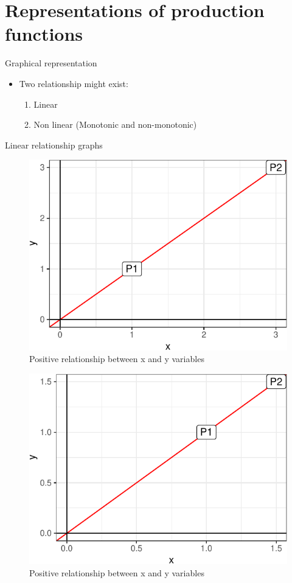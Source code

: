 \documentclass[12pt,ignorenonframetext,aspectratio=169]{beamer}
\providecommand{\tightlist}{%
  \setlength{\itemsep}{0pt}\setlength{\parskip}{0pt}}
\begin{document}
\hypertarget{representations-of-production-functions}{%
\section{Representations of production
functions}\label{representations-of-production-functions}}

\begin{frame}{Graphical representation}
\protect\hypertarget{graphical-representation}{}
\begin{itemize}
\tightlist
\item
  Two relationship might exist:

  \begin{enumerate}
  \tightlist
  \item
    Linear
  \item
    Non linear (Monotonic and non-monotonic)
  \end{enumerate}
\end{itemize}
\end{frame}

\begin{frame}{Linear relationship graphs}
\protect\hypertarget{linear-relationship-graphs}{}
\begin{figure}
\includegraphics[width=0.28\linewidth]{02-production_economics_files/figure-beamer/linear-relationship-positive-1} \caption{Positive relationship between x and y variables}\label{fig:linear-relationship-positive-1}
\end{figure}
\begin{figure}
\includegraphics[width=0.28\linewidth]{02-production_economics_files/figure-beamer/linear-relationship-positive-2} \caption{Positive relationship between x and y variables}\label{fig:linear-relationship-positive-2}
\end{figure}
\end{frame}
\end{document}
